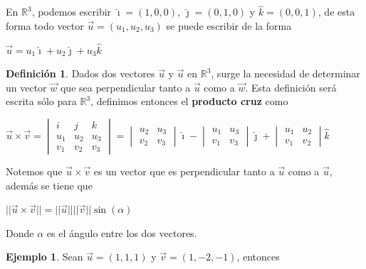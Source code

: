 \documentclass{article}
\theoremstyle{plain}
\theoremstyle{definition}
\newtheorem{defin}[thm]{Definición}
\newtheorem{ejem}[thm]{Ejemplo}
\begin{document}
En $\mathbb{R}^3$, podemos escribir $\hat{\imath}=(1,0,0)$, $\hat{\jmath}=(0,1,0)$ y $\hat{k}=(0,0,1)$, de esta forma todo vector $\overrightarrow{u} =(u_1,u_2,u_3)$ se puede escribir de la forma

\begin{center}
$\overrightarrow{u}= u_1 \hat{\imath} +u_2\hat{\jmath}+u_3\hat{k}$
\end{center}




\begin{defin}Dados dos vectores $\overrightarrow{u}$ y $\overrightarrow{u}$ en $\mathbb{R}^3$, surge la necesidad de determinar un vector $\overrightarrow{w}$ que sea perpendicular tanto a $\overrightarrow{u}$ como a $\overrightarrow{w}$. Esta definición será escrita sólo para $\mathbb{R}^3$, definimos entonces el \textbf{producto cruz} como
\end{defin}

\begin{center}
$ \overrightarrow{u} \times \overrightarrow{v} = \begin{vmatrix}
i & j & k\\
u_1 & u_2 & u_3\\
v_1 & v_2 & v_3
\end{vmatrix} =  \begin{vmatrix}
u_2 & u_3 \\
v_2 & v_3
\end{vmatrix} \hat{\imath}- \begin{vmatrix}
u_1 & u_3 \\
v_1 & v_3
\end{vmatrix} \hat{\jmath} + \begin{vmatrix}
u_1 & u_2 \\
v_1 & v_2
\end{vmatrix} \hat{k}$
\end{center}

Notemos que $\overrightarrow{u} \times \overrightarrow{v}$ es un vector que es perpendicular tanto a $\overrightarrow{u}$ como a $\overrightarrow{u}$, además se tiene que

\begin{center}
$||\overrightarrow{u} \times \overrightarrow{v} || =||\overrightarrow{u}||||\overrightarrow{v}|| \sin(\alpha)$
\end{center}


Donde $\alpha$ es el ángulo entre los dos vectores. \\


\begin{ejem}Sean $\overrightarrow{u} =(1,1,1)$ y $\overrightarrow{v} = (1,-2,-1) $, entonces
\end{ejem}
\end{document}
